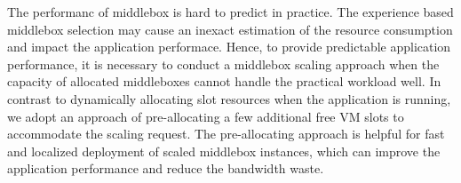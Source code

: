 \documentclass[review]{elsarticle}
\begin{document}
The performanc of middlebox is hard to predict in practice. The experience based middlebox selection may cause an inexact estimation of the resource consumption and impact the application performace. %
Hence, 
to provide predictable application performance,
it is necessary to conduct a middlebox scaling approach %
when the capacity of allocated middleboxes cannot handle the practical workload well. 
In contrast to dynamically allocating slot resources when the application is running, %
we adopt an approach of pre-allocating a few additional free VM slots to accommodate the scaling request.
The pre-allocating approach is helpful for fast and localized deployment of scaled middlebox instances, which 
can improve the application performance and reduce the bandwidth waste.  %



\end{document}
